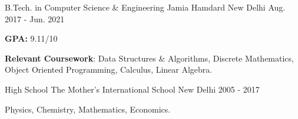 

\begin{cventries}

  \cventry
    {B.Tech. in Computer Science \& Engineering} %
    {Jamia Hamdard} %
    {New Delhi} %
    {Aug. 2017 - Jun. 2021} %
    {
      \begin{cvitems} %
        \item \textbf{GPA:} 9.11/10
        \item {\textbf{Relevant Coursework}: Data Structures \& Algorithms, Discrete Mathematics, Object Oriented Programming, Calculus, Linear Algebra.}
      \end{cvitems}
    }
    
  \cventry
    {High School} %
    {The Mother's International School} %
    {New Delhi} %
    {2005 - 2017} %
    {
      \begin{cvitems} %
        \item {Physics, Chemistry, Mathematics, Economics.}
      \end{cvitems}
    }

\end{cventries}
